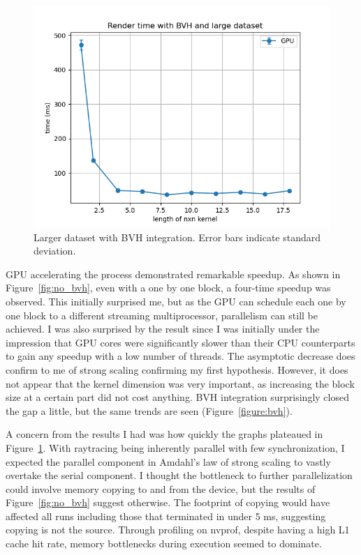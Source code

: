 \documentclass[11pt]{article}
\begin{document}
\begin{figure}
    \centering
    \includegraphics[scale=.6]{world16b16.png}
    \caption{Larger dataset with BVH integration. Error bars indicate standard deviation.}
    \label{figure:large}
\end{figure}

GPU accelerating the process demonstrated remarkable speedup. As shown in Figure~\ref{fig:no_bvh}, even with a one by one block, a four-time speedup was
observed. This initially surprised me, but as the GPU can schedule each one by one block to a different streaming multiprocessor, parallelism can still be
achieved. I was also surprised by the result since I was initially under the impression that GPU cores were significantly slower than their CPU counterparts
to gain any speedup with a low number of threads. The asymptotic decrease does confirm to me of strong scaling confirming my first hypothesis. However, it does
not appear that the kernel dimension was very important, as increasing the block size at a certain part did not cost anything. BVH integration surprisingly closed 
the gap a little, but the same trends are seen (Figure~\ref{figure:bvh}). 

A concern from the results I had was how quickly the graphs plateaued in Figure~\ref{figure:large}. With raytracing being inherently parallel with few synchronization, I expected the 
parallel component in Amdahl's law of strong scaling to vastly overtake the serial component. I thought the bottleneck to further parallelization could involve
memory copying to and from the device, but the results of Figure~\ref{fig:no_bvh} suggest otherwise. The footprint of copying would have affected all runs including
those that terminated in under 5 ms, suggesting copying is not the source. Through profiling on nvprof, despite having a high L1 cache hit rate, memory bottlenecks 
during execution seemed to dominate.
\end{document}
